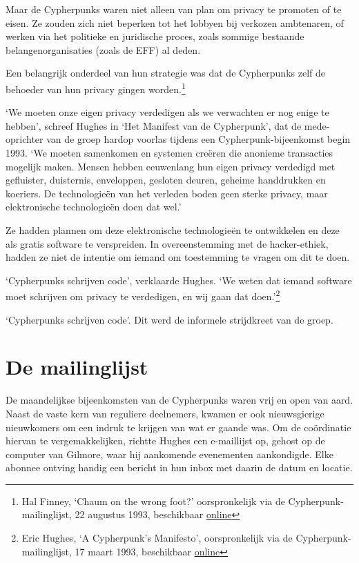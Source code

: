 \documentclass[smalldemyvopaper,11pt,twoside,onecolumn,openright,extrafontsizes,hidelinks]{memoir}
\begin{document}
Maar de Cypherpunks waren niet alleen van plan om privacy te promoten of
te eisen. Ze zouden zich niet beperken tot het lobbyen bij verkozen
ambtenaren, of werken via het politieke en juridische proces, zoals
sommige bestaande belangenorganisaties (zoals de EFF) al deden.

Een belangrijk onderdeel van hun strategie was dat de Cypherpunks zelf
de behoeder van hun privacy gingen worden.\footnote{Hal Finney, `Chaum
  on the wrong foot?' oorspronkelijk via de Cypherpunk-mailinglijst, 22
  augustus 1993, beschikbaar
  \href{https://cypherpunks.venona.com/date/1993/08/msg00652.html}{online}}

`We moeten onze eigen privacy verdedigen als we verwachten er nog enige
te hebben', schreef Hughes in `Het Manifest van de Cypherpunk', dat de
mede-oprichter van de groep hardop voorlas tijdens een
Cypherpunk-bijeenkomst begin 1993. `We moeten samenkomen en systemen
creëren die anonieme transacties mogelijk maken. Mensen hebben
eeuwenlang hun eigen privacy verdedigd met gefluister, duisternis,
enveloppen, gesloten deuren, geheime handdrukken en koeriers. De
technologieën van het verleden boden geen sterke privacy, maar
elektronische technologieën doen dat wel.'

Ze hadden plannen om deze elektronische technologieën te ontwikkelen en
deze als gratis software te verspreiden. In overeenstemming met de
hacker-ethiek, hadden ze niet de intentie om iemand om toestemming te
vragen om dit te doen.

`Cypherpunks schrijven code', verklaarde Hughes. `We weten dat iemand
software moet schrijven om privacy te verdedigen, en wij gaan dat
doen.'\footnote{Eric Hughes, `A Cypherpunk's Manifesto', oorspronkelijk
  via de Cypherpunk-mailinglijst, 17 maart 1993, beschikbaar
  \href{https://cypherpunks.venona.com/date/1993/03/msg00392.html}{online}}

`Cypherpunks schrijven code'. Dit werd de informele strijdkreet van de
groep.

\section{De mailinglijst}\label{de-mailinglijst}

De maandelijkse bijeenkomsten van de Cypherpunks waren vrij en open van
aard. Naast de vaste kern van reguliere deelnemers, kwamen er ook
nieuwsgierige nieuwkomers om een indruk te krijgen van wat er gaande
was. Om de coördinatie hiervan te vergemakkelijken, richtte Hughes een
e-maillijst op, gehost op de computer van Gilmore, waar hij aankomende
evenementen aankondigde. Elke abonnee ontving handig een bericht in hun
inbox met daarin de datum en locatie.
\end{document}
